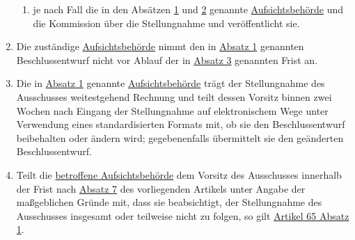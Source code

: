 \begin{enumerate}
\begin{enumerate}
    \item je nach Fall die in den Absätzen \hyperref[itm:64-1]{1} und \hyperref[itm:64-2]{2} genannte \hyperref[itm:04-21]{Aufsichtsbehörde}
     und die Kommission über die Stellungnahme und veröffentlicht sie.
    \label{itm:64-5b}

  \end{enumerate}

  \item Die zuständige \hyperref[itm:04-21]{Aufsichtsbehörde} nimmt den in \hyperref[itm:64-1]{Absatz 1} genannten Beschlussentwurf nicht vor
   Ablauf der in \hyperref[itm:64-3]{Absatz 3} genannten Frist an.
  \label{itm:64-6}

  \item Die in \hyperref[itm:64-1]{Absatz 1} genannte \hyperref[itm:04-21]{Aufsichtsbehörde} trägt der Stellungnahme des Ausschusses
   weitestgehend Rechnung und teilt dessen Vorsitz binnen zwei Wochen nach Eingang der Stellungnahme auf elektronischem
   Wege unter Verwendung eines standardisierten Formats mit, ob sie den Beschlussentwurf beibehalten oder ändern wird;
   gegebenenfalls übermittelt sie den geänderten Beschlussentwurf.
  \label{itm:64-7}

  \item Teilt die \hyperref[itm:04-22]{betroffene Aufsichtsbehörde} dem Vorsitz des Ausschusses innerhalb der Frist nach \hyperref[itm:64-7]
   {Absatz 7} des vorliegenden Artikels unter Angabe der maßgeblichen Gründe mit, dass sie beabsichtigt, der
   Stellungnahme des Ausschusses insgesamt oder teilweise nicht zu folgen, so gilt \hyperref[itm:65-2]{Artikel 65
   Absatz 1}.
  \label{itm:64-8}

\end{enumerate}


